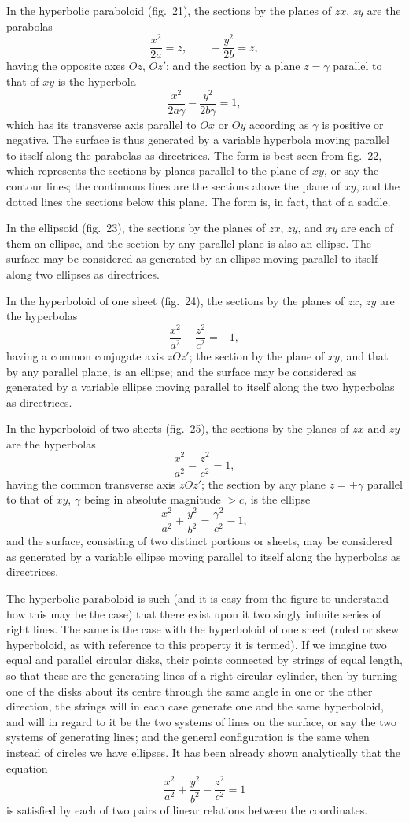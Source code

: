 \documentclass[11pt,a4paper]{book}
\begin{document}
In the hyperbolic paraboloid (fig.~21), the sections by the planes of $zx$, $zy$ are the parabolas
\[
\frac{x^{2}}{2a} = z, \qquad -\frac{y^{2}}{2b} = z,
\]
having the opposite axes $Oz$, $Oz'$; and the section by a plane $z = \gamma$ parallel to that of $xy$ is the hyperbola
\[
\frac{x^{2}}{2a\gamma} - \frac{y^{2}}{2b\gamma} = 1,
\]
which has its transverse axis parallel to $Ox$ or $Oy$ according as $\gamma$ is positive or negative. The surface is thus generated by a variable hyperbola moving parallel to itself along the parabolas as directrices. The form is best seen from fig.~22, which represents the sections by planes parallel to the plane of $xy$, or say the contour lines; the continuous lines are the sections above the plane of $xy$, and the dotted lines the sections below this plane. The form is, in fact, that of a saddle.

In the ellipsoid (fig.~23), the sections by the planes of $zx$, $zy$, and $xy$ are each of them an ellipse, and the section by any parallel plane is also an ellipse. The surface may be considered as generated by an ellipse moving parallel to itself along two ellipses as directrices.

In the hyperboloid of one sheet (fig.~24), the sections by the planes of $zx$, $zy$ are the hyperbolas
\[
\frac{x^{2}}{a^{2}} - \frac{z^{2}}{c^{2}} = -1,
\]
having a common conjugate axis $zOz'$; the section by the plane of $xy$, and that by any parallel plane, is an ellipse; and the surface may be considered as generated by a variable ellipse moving parallel to itself along the two hyperbolas as directrices.

In the hyperboloid of two sheets (fig.~25), the sections by the planes of $zx$ and $zy$ are the hyperbolas
\[
\frac{x^{2}}{a^{2}} - \frac{z^{2}}{c^{2}} = 1,
\]
having the common transverse axis $zOz'$; the section by any plane $z = \pm\gamma$ parallel to that of $xy$, $\gamma$ being in absolute magnitude $> c$, is the ellipse
\[
\frac{x^{2}}{a^{2}} + \frac{y^{2}}{b^{2}} = \frac{\gamma^{2}}{c^{2}} - 1,
\]
and the surface, consisting of two distinct portions or sheets, may be considered as generated by a variable ellipse moving parallel to itself along the hyperbolas as directrices.

The hyperbolic paraboloid is such (and it is easy from the figure to understand how this may be the case) that there exist upon it two singly infinite series of right lines. The same is the case with the hyperboloid of one sheet (ruled or skew hyperboloid, as with reference to this property it is termed). If we imagine two equal and parallel circular disks, their points connected by strings of equal length, so that these are the generating lines of a right circular cylinder, then by turning one of the disks about its centre through the same angle in one or the other direction, the strings will in each case generate one and the same hyperboloid, and will in regard to it be the two systems of lines on the surface, or say the two systems of generating lines; and the general configuration is the same when instead of circles we have ellipses. It has been already shown analytically that the equation
\[
\frac{x^{2}}{a^{2}} + \frac{y^{2}}{b^{2}} - \frac{z^{2}}{c^{2}} = 1
\]
is satisfied by each of two pairs of linear relations between the coordinates.
\end{document}
